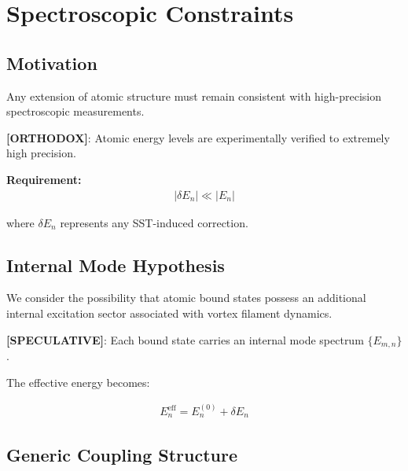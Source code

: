 \documentclass[11pt]{article}
\theoremstyle{definition}
\theoremstyle{plain}
\theoremstyle{remark}
\begin{document}
        
\section{Spectroscopic Constraints}
    \label{sec:spectroscopy}
    
    \subsection{Motivation}
        
        Any extension of atomic structure must remain consistent with high-precision spectroscopic measurements.
        
        \textbf{[ORTHODOX]}:
        Atomic energy levels are experimentally verified to extremely high precision.
        
        \textbf{Requirement:}
        \begin{align}
            |\delta E_n| \ll |E_n|
            \label{eq:spectro_constraint}
        \end{align}
        
        where $\delta E_n$ represents any SST-induced correction.
    
    \subsection{Internal Mode Hypothesis}
        
        We consider the possibility that atomic bound states possess an additional internal excitation sector associated with vortex filament dynamics.
        
        \textbf{[SPECULATIVE]}:
        Each bound state carries an internal mode spectrum $\{E_{m,n}\}$.
        
        The effective energy becomes:
        
        \begin{align}
            E_n^{\text{eff}} = E_n^{(0)} + \delta E_n
            \label{eq:effective_energy}
        \end{align}
    
    \subsection{Generic Coupling Structure}
        
\end{document}
